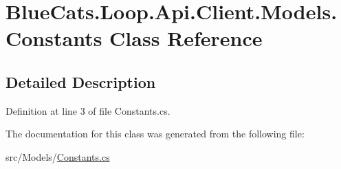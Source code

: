 \hypertarget{class_blue_cats_1_1_loop_1_1_api_1_1_client_1_1_models_1_1_constants}{}\section{Blue\+Cats.\+Loop.\+Api.\+Client.\+Models.\+Constants Class Reference}
\label{class_blue_cats_1_1_loop_1_1_api_1_1_client_1_1_models_1_1_constants}


\subsection{Detailed Description}


Definition at line 3 of file Constants.\+cs.



The documentation for this class was generated from the following file\+:\begin{DoxyCompactItemize}
\item 
src/\+Models/\mbox{\hyperlink{_constants_8cs}{Constants.\+cs}}\end{DoxyCompactItemize}
